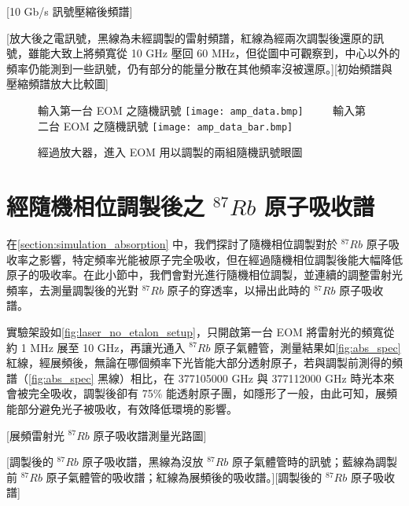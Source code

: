 \documentclass[class=NCU_thesis, crop=false]{standalone}
\begin{document}
[10 Gb/s 訊號壓縮後頻譜]

[放大後之電訊號，黑線為未經調製的雷射頻譜，紅線為經兩次調製後還原的訊號，雖能大致上將頻寬從 10 GHz 壓回 60 MHz，但從圖中可觀察到，中心以外的頻率仍能測到一些訊號，仍有部分的能量分散在其他頻率沒被還原。][初始頻譜與壓縮頻譜放大比較圖]

\begin{figure}[!hbt]
    \centering
    \subcaptionbox
        {輸入第一台 EOM 之隨機訊號
        \label{fig:subfig_fig1}}
        {\texttt{[image: amp\_data.bmp]}}
    ~~~~
    \subcaptionbox
        {輸入第二台 EOM 之隨機訊號
        \label{fig:subfig_fig2}}
        {\texttt{[image: amp\_data\_bar.bmp]}}
    \caption{經過放大器，進入 EOM 用以調製的兩組隨機訊號眼圖}
    \label{fig:amplified_signal}
\end{figure}

\section{經隨機相位調製後之 $^{87}Rb$ 原子吸收譜}

在\cref{section:simulation_absorption} 中，我們探討了隨機相位調製對於 $^{87}Rb$ 原子吸收率之影響，特定頻率光能被原子完全吸收，但在經過隨機相位調製後能大幅降低原子的吸收率。在此小節中，我們會對光進行隨機相位調製，並連續的調整雷射光頻率，去測量調製後的光對 $^{87}Rb$ 原子的穿透率，以掃出此時的 $^{87}Rb$ 原子吸收譜。

實驗架設如\cref{fig:laser_no_etalon_setup}，只開啟第一台 EOM 將雷射光的頻寬從約 1 MHz 展至 10 GHz，再讓光通入 $^{87}Rb$ 原子氣體管，測量結果如\cref{fig:abs_spec} 紅線，經展頻後，無論在哪個頻率下光皆能大部分透射原子，若與調製前測得的頻譜（\cref{fig:abs_spec} 黑線）相比，在 377105000 GHz 與 377112000 GHz 時光本來會被完全吸收，調製後卻有 75\% 能透射原子團，如隱形了一般，由此可知，展頻能部分避免光子被吸收，有效降低環境的影響。

[展頻雷射光 $^{87}Rb$ 原子吸收譜測量光路圖]

[調製後的 $^{87}Rb$ 原子吸收譜，黑線為沒放 $^{87}Rb$ 原子氣體管時的訊號；藍線為調製前 $^{87}Rb$ 原子氣體管的吸收譜；紅線為展頻後的吸收譜。][調製後的 $^{87}Rb$ 原子吸收譜]
\end{document}
